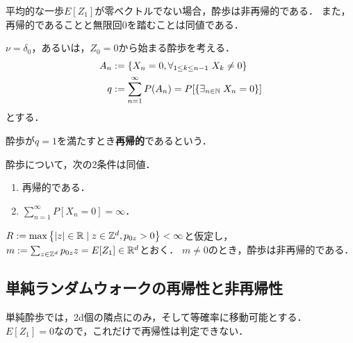 \documentclass[uplatex,dvipdfmx]{jsreport}
\begin{document}
\begin{tcolorbox}[colframe=ForestGreen, colback=ForestGreen!10!white,breakable,colbacktitle=ForestGreen!40!white,coltitle=black,fonttitle=\bfseries\sffamily,
title=]
    平均的な一歩$E[Z_1]$が零ベクトルでない場合，酔歩は非再帰的である．
    また，再帰的であることと無限回$0$を踏むことは同値である．
\end{tcolorbox}

\begin{notation}
    $\nu=\delta_0$，あるいは，$Z_0=0$から始まる酔歩を考える．
    \begin{align*}
        A_n&:=\left\{X_n=0,\forall_{1\le k\le n-1}\;X_k\ne0\right\}\\
        q&:=\sum^\infty_{n=1}P(A_n)=P[\left\{\exists_{n\in\mathbb{N}}\;X_n=0\right\}]
    \end{align*}
    とする．
\end{notation}

\begin{definition}[recurrent]
    酔歩が$q=1$を満たすとき\textbf{再帰的}であるという．
\end{definition}

\begin{lemma}
    酔歩について，次の2条件は同値．
    \begin{enumerate}
        \item 再帰的である．
        \item $\sum^\infty_{n=1}P[X_n=0]=\infty$．
    \end{enumerate}
\end{lemma}

\begin{theorem}[非再帰性の十分条件]
    $R:=\max\left\{\lvert z\rvert\in\mathbb{R}\mid z\in\mathbb{Z}^d,p_{0z}>0\right\}<\infty$と仮定し，
    $m:=\sum_{z\in\mathbb{Z}^d}p_{0z}z=E[Z_1]\in\mathbb{R}^d$とおく．
    $m\ne0$のとき，酔歩は非再帰的である．
\end{theorem}

\subsection{単純ランダムウォークの再帰性と非再帰性}

\begin{tcolorbox}[colframe=ForestGreen, colback=ForestGreen!10!white,breakable,colbacktitle=ForestGreen!40!white,coltitle=black,fonttitle=\bfseries\sffamily,
title=]
    単純酔歩では，2d個の隣点にのみ，そして等確率に移動可能とする．
    $E[Z_1]=0$なので，これだけで再帰性は判定できない．
\end{tcolorbox}
\end{document}
